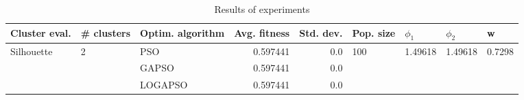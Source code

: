\begin{table}
\centering
\caption{Results of experiments}
\begin{tabular}{lllrrllll}
\toprule
              Cluster eval. &        \# clusters & Optim. algorithm &  Avg. fitness &  Std. dev. &            Pop. size &               $\phi_{1}$ &               $\phi_{2}$ &                       w \\
\midrule
\multirow{3}{*}{Silhouette} & \multirow{3}{*}{2} &              PSO &      0.597441 &        0.0 & \multirow{3}{*}{100} & \multirow{3}{*}{1.49618} & \multirow{3}{*}{1.49618} & \multirow{3}{*}{0.7298} \\
                            &                    &            GAPSO &      0.597441 &        0.0 &                      &                          &                          &                         \\
                            &                    &          LOGAPSO &      0.597441 &        0.0 &                      &                          &                          &                         \\
\bottomrule
\end{tabular}
\end{table}
